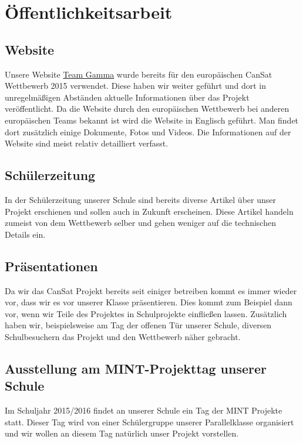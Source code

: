 \section{Öffentlichkeitsarbeit}
\subsection{Website}
Unsere Website \href{www.team-gamma.de}{Team Gamma} wurde bereits für den europäischen CanSat Wettbewerb 2015 verwendet. Diese haben wir weiter geführt und dort in unregelmäßigen Abständen aktuelle Informationen über das Projekt veröffentlicht. Da die Website durch den europäischen Wettbewerb bei anderen europäischen Teams bekannt ist wird die Website in Englisch geführt. Man findet dort zusätzlich einige Dokumente, Fotos und Videos. Die Informationen auf der Website sind meist relativ detailliert verfasst. 

\subsection{Schülerzeitung}
In der Schülerzeitung unserer Schule sind bereits diverse Artikel über unser Projekt erschienen und sollen auch in Zukunft erscheinen. Diese Artikel handeln zumeist von dem Wettbewerb selber und gehen weniger auf die technischen Details ein.

\subsection{Präsentationen}
Da wir das CanSat Projekt bereits seit einiger betreiben kommt es immer wieder vor, dass wir es vor unserer Klasse präsentieren. Dies kommt zum Beispiel dann vor, wenn wir Teile des Projektes in Schulprojekte einfließen lassen. Zusätzlich haben wir, beispielsweise am Tag der offenen Tür unserer Schule, diversen Schulbesuchern das Projekt und den Wettbewerb näher gebracht.

\subsection{Ausstellung am MINT-Projekttag unserer Schule}
Im Schuljahr 2015/2016 findet an unserer Schule ein Tag der MINT Projekte statt. Dieser Tag wird von einer Schülergruppe unserer Parallelklasse organisiert und wir wollen an diesem Tag natürlich unser Projekt vorstellen.

